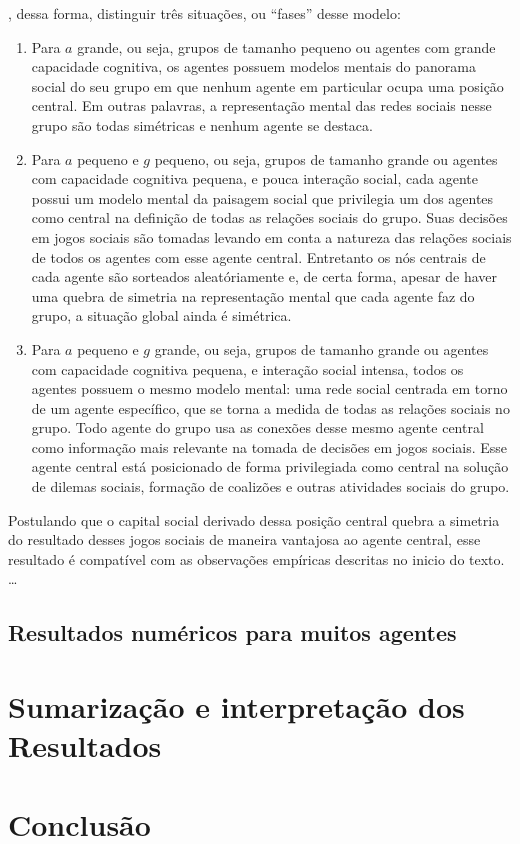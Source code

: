, dessa forma, distinguir três situações, ou ``fases'' desse modelo:
\begin{enumerate}
 \item Para $a$ grande, ou seja, grupos de tamanho pequeno ou agentes com grande capacidade cognitiva, os agentes possuem modelos mentais do panorama social do seu grupo em que nenhum agente em particular ocupa uma posição central. Em outras palavras, a representação mental das redes sociais nesse grupo são todas simétricas e nenhum agente se destaca. 

 \item Para $a$ pequeno e $g$ pequeno, ou seja, grupos de tamanho grande ou agentes com capacidade cognitiva pequena, e pouca interação social, cada agente possui um modelo mental da paisagem social que privilegia um dos agentes como central na definição de todas as relações sociais do grupo. Suas decisões em jogos sociais são tomadas levando em conta a natureza das relações sociais de todos os agentes com esse agente central. Entretanto os nós centrais de cada agente são sorteados aleatóriamente e, de certa forma, apesar de haver uma quebra de simetria na representação mental que cada agente faz do grupo, a situação global ainda é simétrica. 

 \item Para $a$ pequeno e $g$ grande,  ou seja, grupos de tamanho grande ou agentes com capacidade cognitiva pequena, e interação social intensa, todos os agentes possuem o mesmo modelo mental: uma rede social centrada em torno de um agente específico, que se torna a medida de todas as relações sociais no grupo. Todo agente do grupo usa as conexões desse mesmo agente central como informação mais relevante na tomada de decisões em jogos sociais. Esse agente central está posicionado de forma privilegiada como central na solução de dilemas sociais, formação de coalizões e outras atividades sociais do grupo. 
\end{enumerate}
Postulando que o capital social derivado dessa posição central quebra a simetria do resultado desses jogos sociais de maneira vantajosa ao agente central, esse resultado é compatível com as observações empíricas descritas no inicio do texto. 
\ldots
\subsection{Resultados numéricos para muitos agentes}
\section{Sumarização e interpretação dos Resultados}
\section{Conclusão}

